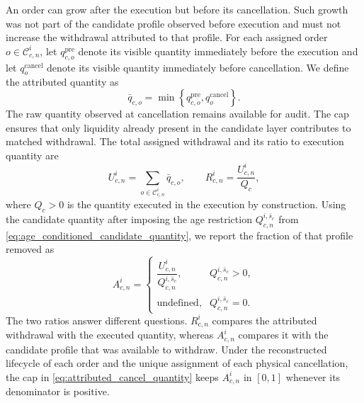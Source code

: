 \documentclass[11pt]{article}
\newenvironment{review}{\begingroup\color{blue}}{\endgroup}
\begin{document}
An order can grow after the execution but before its cancellation. Such growth was not part of \begin{review}the candidate profile observed before execution\end{review} and must not increase the withdrawal attributed to that profile. For each assigned order
$o\in\mathcal{C}_{c,n}^{i}$, let $q^{\mathrm{pre}}_{c,o}$ denote its visible quantity immediately before the execution and let
$q^{\mathrm{cancel}}_o$ denote its visible quantity immediately before cancellation. We define the attributed quantity as
\begin{equation}
    \bar q_{c,o}
    =
    \min\!\left\{q^{\mathrm{pre}}_{c,o},q^{\mathrm{cancel}}_o\right\}.
    \label{eq:attributed_cancel_quantity}
\end{equation}
\begin{review}The raw quantity observed at cancellation\end{review} remains available for audit. The cap ensures that only liquidity already present in the
candidate layer contributes to matched withdrawal. The total assigned withdrawal and its ratio to execution quantity are
\begin{equation}
    U^{i}_{c,n}=\sum_{o\in\mathcal{C}_{c,n}^{i}}\bar q_{c,o},
    \qquad
    R^{i}_{c,n}=\frac{U^{i}_{c,n}}{Q_c},
    \label{eq:assigned_withdrawal}
\end{equation}
where $Q_c>0$ is \begin{review}the quantity executed in the execution\end{review} by construction. Using \begin{review}the candidate quantity after imposing the age restriction\end{review}
$Q^{i,\bar{s}_c}_{c,n}$ from \cref{eq:age_conditioned_candidate_quantity}, we report the fraction of that profile removed as
\begin{equation}
    A^{i}_{c,n}
    =\begin{cases}
    \dfrac{U^{i}_{c,n}}{Q^{i,\bar{s}_c}_{c,n}},
    & Q^{i,\bar{s}_c}_{c,n}>0,\\
    \text{undefined},
    & Q^{i,\bar{s}_c}_{c,n}=0.
    \end{cases}
    \label{eq:assigned_withdrawal_share}
\end{equation}
The two ratios answer different questions. $R^{i}_{c,n}$ compares the attributed withdrawal with the executed quantity,
whereas $A^{i}_{c,n}$ compares it with the candidate profile that was available to withdraw. Under \begin{review}the reconstructed lifecycle of each order and the unique assignment of each physical cancellation\end{review}, the cap in \cref{eq:attributed_cancel_quantity} keeps
$A^{i}_{c,n}$ in $[0,1]$ whenever its denominator is positive.
\end{document}
